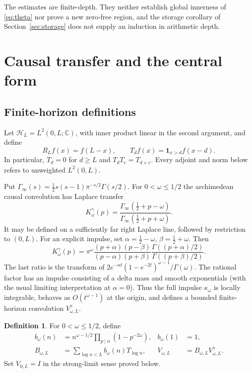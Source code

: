 \documentclass[11pt]{article}
\numberwithin{equation}{section}
\theoremstyle{definition}
\newtheorem{definition}[theorem]{Definition}
\theoremstyle{remark}
\newcommand{\HH}{\mathcal H}
\newcommand{\CC}{\mathbb C}
\newcommand{\gam}{\Gamma_\infty}
\begin{document}
The estimates are finite-depth. They neither establish global innerness of
\eqref{eq:theta} nor prove a new zero-free region, and the storage corollary
of Section~\ref{sec:storage} does not supply an induction in arithmetic depth.

\section{Causal transfer and the central form}\label{sec:operators}

\subsection{Finite-horizon definitions}

Let $\HH_L=L^2(0,L;\CC)$, with inner product linear in the second argument,
and define
\[
 R_Lf(x)=f(L-x),\qquad T_df(x)=\mathbf1_{x>d}f(x-d).
\]
In particular, $T_d=0$ for $d\ge L$ and
$T_dT_e=T_{d+e}$. Every adjoint and norm below refers to unweighted
$L^2(0,L)$.

Put $\gam(s)=\tfrac12s(s-1)\pi^{-s/2}\Gamma(s/2)$. For $0<\omega\le1/2$
the archimedean causal convolution has Laplace transfer
\begin{equation}\label{eq:gammaK}
 K^\gamma_\omega(p)=
 \frac{\gam(\tfrac12+p-\omega)}{\gam(\tfrac12+p+\omega)}.
\end{equation}
It may be defined on a sufficiently far right Laplace line, followed by
restriction to $(0,L)$. For an explicit impulse, set
$\alpha=\tfrac12-\omega$, $\beta=\tfrac12+\omega$. Then
\begin{equation}\label{eq:gammafactor}
 K^\gamma_\omega(p)=\pi^\omega
 \frac{(p+\alpha)(p-\beta)}{(p-\alpha)(p+\beta)}
 \frac{\Gamma((p+\alpha)/2)}{\Gamma((p+\beta)/2)}.
\end{equation}
The last ratio is the transform of
$2e^{-\alpha t}(1-e^{-2t})^{\omega-1}/\Gamma(\omega)$.
The rational factor has an impulse consisting of a delta mass and smooth
exponentials (with the usual limiting interpretation at $\alpha=0$).
Thus the full impulse $\kappa_\omega$ is locally integrable, behaves as
$O(t^{\omega-1})$ at the origin, and defines a bounded finite-horizon
convolution $V^\gamma_{\omega,L}$.

\begin{definition}\label{def:transfer}
For $0<\omega\le1/2$, define
\begin{align}
 b_\omega(n)&=n^{\omega-1/2}\prod_{p\mid n}(1-p^{-2\omega}),
 & b_\omega(1)&=1,\label{eq:bcoeff}\\
 B_{\omega,L}&=\sum_{\log n<L}b_\omega(n)T_{\log n},
 &V_{\omega,L}&=B_{\omega,L}V^\gamma_{\omega,L}.\label{eq:Vdef}
\end{align}
Set $V_{0,L}=I$ in the strong-limit sense proved below.
\end{definition}
\end{document}
